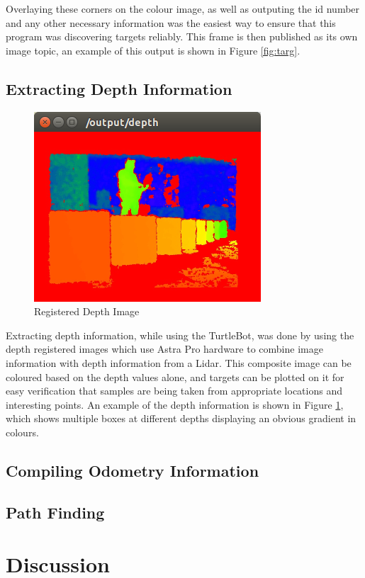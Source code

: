 \documentclass{article}[12]
\begin{document}
Overlaying these corners on the colour image, as well as outputing the id number and any other necessary information was the easiest way to ensure that this program was discovering targets reliably. This frame is then published as its own image topic, an example of this output is shown in Figure \ref{fig:targ}.

\subsection{Extracting Depth Information}

\begin{figure}[H]
	\centering
	\includegraphics[width=0.45\linewidth]{verificationDepth}
	\caption{Registered Depth Image}
	\label{fig:deeeeeeeeeeeeeeeeeeeeeeeeeeeeeeeeeeeeeeeeeeeeeeeeeeeeeep}
\end{figure}

Extracting depth information, while using the TurtleBot, was done by using the depth registered images which use Astra Pro hardware to combine image information with depth information from a Lidar. This composite image can be coloured based on the depth values alone, and targets can be plotted on it for easy verification that samples are being taken from appropriate locations and interesting points. An example of the depth information is shown in Figure \ref{fig:deeeeeeeeeeeeeeeeeeeeeeeeeeeeeeeeeeeeeeeeeeeeeeeeeeeeeep}, which shows multiple boxes at different depths displaying an obvious gradient in colours.

\subsection{Compiling Odometry Information}

\subsection{Path Finding}


\section{Discussion}
\end{document}
